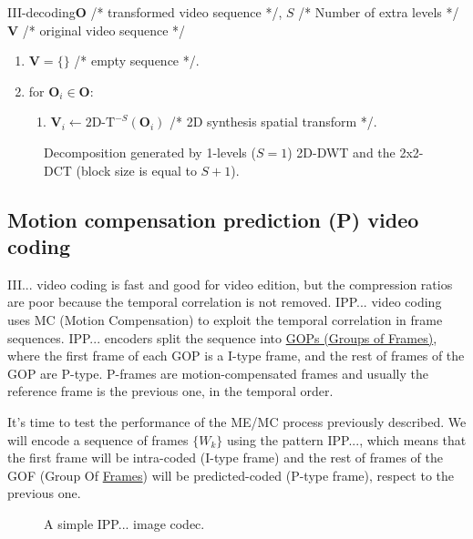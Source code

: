 \begin{myalg}{III-decoding}{$\mathbf{O}$ /* transformed video sequence */, $S$ /* Number of extra levels */}{$\mathbf{V}$ /* original video sequence */}
  \label{alg:III_decoding}
  \begin{enumerate}
  \item ${\mathbf V}=\{\}$ /* empty sequence */.
  \item for ${\mathbf O}_i\in {\mathbf O}$:
    \begin{enumerate}
    \item ${\mathbf V}_i\leftarrow\text{2D-T}^{-S}({\mathbf O}_i)$ /* 2D synthesis spatial transform */.
    \end{enumerate}
  \end{enumerate}
\end{myalg}

\begin{figure}
  \centering
  \caption{Decomposition generated by 1-levels ($S=1$) 2D-DWT and the 2x2-DCT (block size is equal to $S+1$).}
  \label{fig:III}
\end{figure}

\subsection{Motion compensation prediction (P) video coding}

III... video coding is fast and good for video edition, but the
compression ratios are poor because the temporal correlation is not
removed. IPP... video coding uses MC (Motion Compensation) to exploit
the temporal correlation in frame sequences. IPP... encoders split the
sequence into
\href{https://en.wikipedia.org/wiki/Group_of_pictures}{GOPs (Groups of
  Frames)}, where the first frame of each GOP is a I-type frame, and
the rest of frames of the GOP are P-type. P-frames are
motion-compensated frames and usually the reference frame is the
previous one, in the temporal order.

It's time to test the performance of the ME/MC process previously
described. We will encode a sequence of frames $\{W_k\}$ using the
pattern IPP..., which means that the first frame will be intra-coded
(I-type frame) and the rest of frames of the GOF (Group Of
\href{https://en.wikipedia.org/wiki/Group_of_pictures}{Frames}) will
be predicted-coded (P-type frame), respect to the previous one.

\begin{figure}
  \centering
  \caption{A simple IPP... image codec.}
\label{fig:IPP_codec}
\end{figure}

